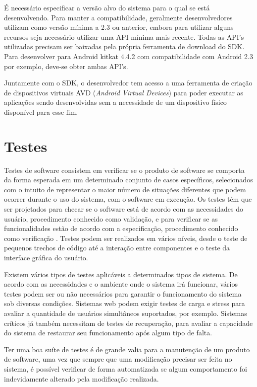 É necessário especificar a versão alvo do sistema para o qual se está desenvolvendo. Para manter a compatibilidade, geralmente desenvolvedores utilizam como versão mínima a 2.3 ou anterior, embora para utilizar alguns recursos seja necessário utilizar uma API mínima mais recente. Todas as API's utilizadas precisam ser baixadas pela própria ferramenta de download do SDK. Para desenvolver para Android kitkat 4.4.2 com compatibilidade com Android 2.3 por exemplo, deve-se obter ambas API's.

Juntamente com o SDK, o desenvolvedor tem acesso a uma ferramenta de criação de dispositivos virtuais AVD (\textit{Android Virtual Devices}) para poder executar as aplicações sendo desenvolvidas sem a necessidade de um dispositivo físico disponível para esse fim.

\section{Testes}

Testes de software consistem em verificar se o produto de software se comporta da forma esperada em um determinado conjunto de casos específicos, selecionados com o intuito de representar o maior número de situações diferentes que podem ocorrer durante o uso do sistema, com o software em execução. Os testes têm que ser projetados para checar se o software está de acordo com as necessidades do usuário, procedimento conhecido como validação, e para verificar se as funcionalidades estão de acordo com a especificação, procedimento conhecido como verificação \cite{swebok}. Testes podem ser realizados em vários níveis, desde o teste de pequenos trechos de código até a interação entre componentes e o teste da interface gráfica do usuário.

Existem vários tipos de testes aplicáveis a determinados tipos de sistema. De acordo com as necessidades e o ambiente onde o sistema irá funcionar, vários testes podem ser ou não necessários para garantir o funcionamento do sistema sob diversas condições. Sistemas web podem exigir testes de carga e stress para avaliar a quantidade de usuários simultâneos suportados, por exemplo. Sistemas críticos já também necessitam de testes de recuperação, para avaliar a capacidade do sistema de restaurar seu funcionamento após algum tipo de falta.

Ter uma boa suíte de testes é de grande valia para a manutenção de um produto de software, uma vez que sempre que uma modificação precisar ser feita no sistema, é possível verificar de forma automatizada se algum comportamento foi indevidamente alterado pela modificação realizada.

